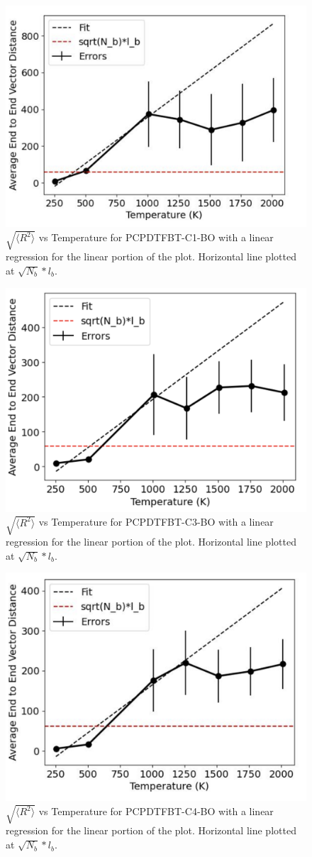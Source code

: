\begin{figure}
    \centering
    \includegraphics[width=0.6\linewidth]{src/figures/pers_l_figs/e-e plots/C1.png}
    \caption{$\sqrt{\langle R^2 \rangle}$ vs Temperature for PCPDTFBT-C1-BO with a linear regression for the linear portion of the plot. Horizontal line plotted at $\sqrt{N_b}*l_b$.}
    \label{fig:e-e_C1}
\end{figure}

\begin{figure}
    \centering
    \includegraphics[width=0.6\linewidth]{src/figures/pers_l_figs/e-e plots/C3.png}
    \caption{$\sqrt{\langle R^2 \rangle}$ vs Temperature for PCPDTFBT-C3-BO with a linear regression for the linear portion of the plot. Horizontal line plotted at $\sqrt{N_b}*l_b$.}
    \label{fig:e-e_C3}
\end{figure}

\begin{figure}
    \centering
    \includegraphics[width=0.6\linewidth]{src/figures/pers_l_figs/e-e plots/C4.png}
    \caption{$\sqrt{\langle R^2 \rangle}$ vs Temperature for PCPDTFBT-C4-BO with a linear regression for the linear portion of the plot. Horizontal line plotted at $\sqrt{N_b}*l_b$.}
    \label{fig:e-e_C4}
\end{figure}

